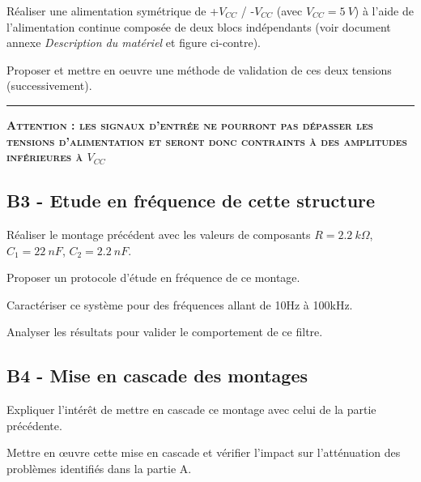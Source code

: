 \documentclass[a4paper,11pt]{article}
\begin{document}
\Real Réaliser une alimentation symétrique de +$V_{CC}$ / -$V_{CC}$ (avec $V_{CC} = 5~V$) à l'aide de l'alimentation continue composée de deux blocs indépendants (voir document annexe \textit{Description du matériel} et figure ci-contre).

\Real Proposer et mettre en oeuvre une méthode de validation de ces deux tensions (successivement).



\noindent \rule{\linewidth}{1pt}

\textbf{\large \textsc{Attention : les signaux d'entrée ne pourront pas dépasser les tensions d'alimentation et seront donc contraints à des amplitudes inférieures à $V_{CC}$}}	

\subsection*{B3 - Etude en fréquence de cette structure}

\Real Réaliser le montage précédent avec les valeurs de composants $R = 2.2~k\Omega$, $C_1 = 22~nF$, $C_2 = 2.2~nF$. 

\Real Proposer un protocole d'étude en fréquence de ce montage.

\Real Caractériser ce système pour des fréquences allant de 10Hz à 100kHz.

\Real Analyser les résultats pour valider le comportement de ce filtre.


\subsection*{B4 - Mise en cascade des montages}

\Real Expliquer l'intérêt de mettre en cascade ce montage avec celui de la partie précédente.

\Real Mettre en \oe{}uvre cette mise en cascade et vérifier l'impact sur l'atténuation des problèmes identifiés dans la partie A.


\end{document}
